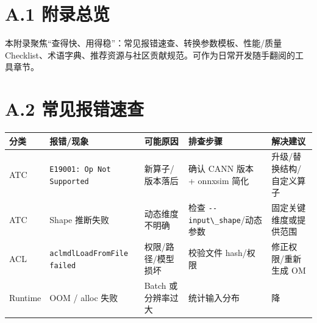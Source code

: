 \section{A.1 附录总览}\label{src-book-appendix-h1}

本附录聚焦``查得快、用得稳''：常见报错速查、转换参数模板、性能/质量
Checklist、术语字典、推荐资源与社区贡献规范。可作为日常开发随手翻阅的工具章节。

\section{A.2 常见报错速查}\label{src-book-appendix-h2}

{ %
\begin{longtable}[]{@{}
  >{\raggedright\arraybackslash}p{}
  >{\raggedright\arraybackslash}p{}
  >{\raggedright\arraybackslash}p{}
  >{\raggedright\arraybackslash}p{}
  >{\raggedright\arraybackslash}p{}@{}}
\toprule\noalign{}
\begin{minipage}[b]{\linewidth}\raggedright
分类
\end{minipage} & \begin{minipage}[b]{\linewidth}\raggedright
报错/现象
\end{minipage} & \begin{minipage}[b]{\linewidth}\raggedright
可能原因
\end{minipage} & \begin{minipage}[b]{\linewidth}\raggedright
排查步骤
\end{minipage} & \begin{minipage}[b]{\linewidth}\raggedright
解决建议
\end{minipage} \\
\midrule\noalign{}
\endhead
\bottomrule\noalign{}
\endlastfoot
ATC & \passthrough{\lstinline!E19001: Op Not Supported!} &
新算子/版本落后 & 确认 CANN 版本 + onnxsim 简化 &
升级/替换结构/自定义算子 \\
ATC & Shape 推断失败 & 动态维度不明确 & 检查
\passthrough{\lstinline!--input\_shape!}/动态参数 &
固定关键维度或提供范围 \\
ACL & \passthrough{\lstinline!aclmdlLoadFromFile failed!} &
权限/路径/模型损坏 & 校验文件 hash/权限 & 修正权限/重新生成 OM \\
Runtime & OOM / alloc 失败 & Batch 或分辨率过大 & 统计输入分布 & 降

\end{longtable}}
